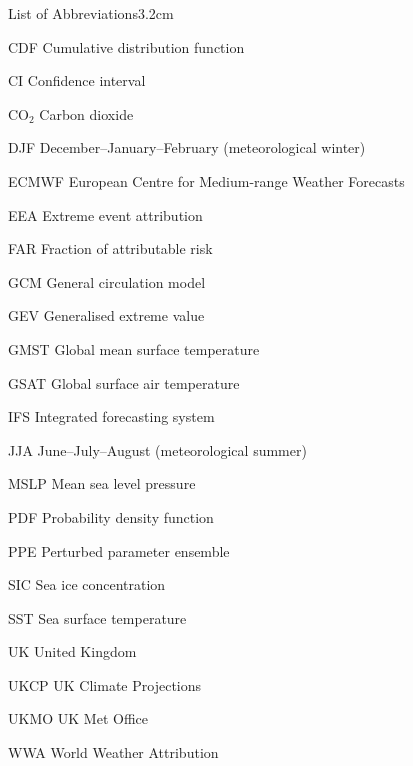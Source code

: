 \begin{mclistof}{List of Abbreviations}{3.2cm}

    \item[CDF] Cumulative distribution function
    \item[CI] Confidence interval 
    \item[CO$_2$] Carbon dioxide
    \item[DJF] December--January--February (meteorological winter)
    \item[ECMWF] European Centre for Medium-range Weather Forecasts
    \item[EEA] Extreme event attribution
    \item[FAR] Fraction of attributable risk
    \item[GCM] General circulation model
    \item[GEV] Generalised extreme value
    \item[GMST] Global mean surface temperature
    \item[GSAT] Global surface air temperature
    \item[IFS] Integrated forecasting system
    \item[JJA] June--July--August (meteorological summer)
    \item[MSLP] Mean sea level pressure
    \item[PDF] Probability density function
    \item[PPE] Perturbed parameter ensemble
    \item[SIC] Sea ice concentration
    \item[SST] Sea surface temperature
    \item[UK] United Kingdom
    \item[UKCP] UK Climate Projections
    \item[UKMO] UK Met Office
    \item[WWA] World Weather Attribution

\end{mclistof}
